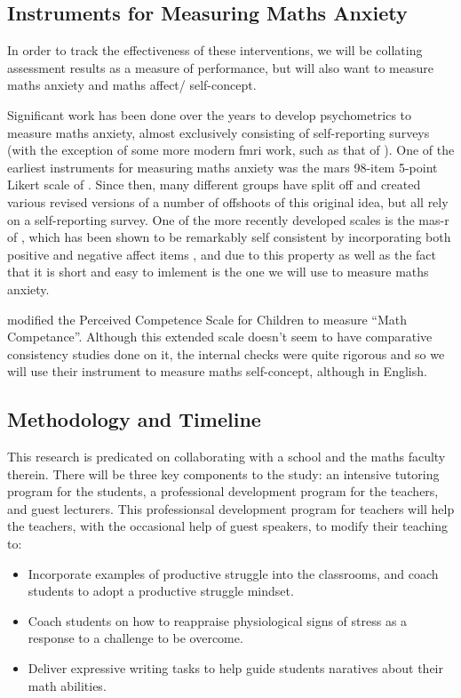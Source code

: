 \documentclass[14pt]{memoir}
\begin{document}
\subsection*{Instruments for Measuring Maths Anxiety}

In order to track the effectiveness of these interventions, we will be collating assessment results as a measure of performance, but will also want to measure maths anxiety and maths affect/ self-concept. 

Significant work has been done over the years to develop psychometrics to measure maths anxiety, almost exclusively consisting of self-reporting surveys (with the exception of some more modern \gls{fmri} work, such as that of ). One of the earliest instruments for measuring maths anxiety was the \gls{mars} 98-item 5-point Likert scale of . Since then, many different groups have split off and created various revised versions of a number of offshoots of this original idea, but all rely on a self-reporting survey. One of the more recently developed scales is the \gls{mas-r} of , which has been shown to be remarkably self consistent by incorporating both positive and negative affect items \cite{Bai2011}, and due to this property as well as the fact that it is short and easy to imlement is the one we will use to measure maths anxiety.

 modified the Perceived Competence Scale for Children \cite{Harter1982} to measure ``Math Competance''. Although this extended scale doesn't seem to have comparative consistency studies done on it, the internal checks  were quite rigorous and so we will use their instrument to measure maths self-concept, although in English.



\subsection*{Methodology and Timeline}

This research is predicated on collaborating with a school and the maths faculty therein. There will be three key components to the study: an intensive tutoring program for the students, a professional development program for the teachers, and guest lecturers. This professionsal development program for teachers will help the teachers, with the occasional help of guest speakers, to modify their teaching to:
\begin{itemize}
	\item Incorporate examples of productive struggle into the classrooms, and coach students to adopt a productive struggle mindset.
	\item Coach students on how to reappraise physiological signs of stress as a response to a challenge to be overcome.
	\item Deliver expressive writing tasks to help guide students naratives about their math abilities.
\end{itemize}
\end{document}
